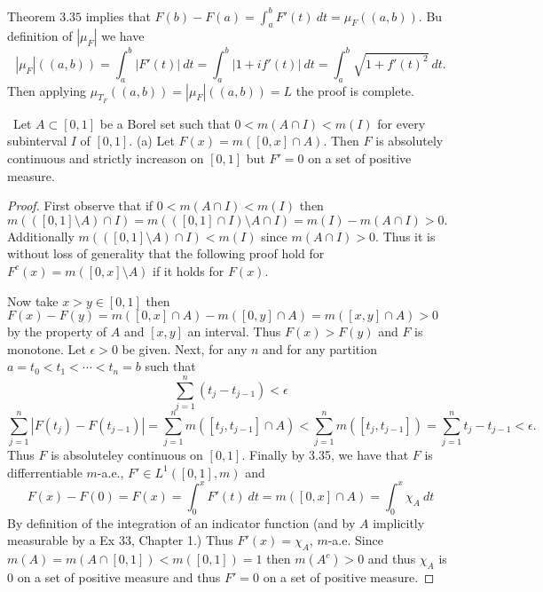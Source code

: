 \documentclass[11pt]{amsart}
\theoremstyle{definition}
\numberwithin{theorem}{section}
\numberwithin{definition}{section}
\numberwithin{equation}{section}
\begin{document}
	Theorem $3.35$ implies that $F(b) - F(a) = \int_a^b F'(t)\ dt = \mu_F((a,b)).$ Bu definition of $|\mu_F|$
	we have 
	\begin{equation*}
		|\mu_F|((a,b)) = \int_{a}^b|F'(t)|\ dt = \int_a^b |1 + i f'(t)|\ dt = \int_a^b \sqrt{1 + f'(t)^2}\ dt.
	\end{equation*}
	Then applying $\mu_{T_F}((a,b)) = |\mu_F|((a,b)) = L$ the proof is complete.

\medskip {}\ Let $A \subset [0,1]$ be a Borel set such that $0 < m(A\cap I) < m(I)$ for every subinterval $I$ of $[0,1]$.
(a) Let $F(x) = m([0,x] \cap A).$ Then $F$ is absolutely continuous and strictly increason on $[0,1]$ but $F' = 0$ on a set of positive measure.
\begin{proof}
	First observe that if $0 < m(A \cap I) < m(I)$ then $m(([0,1] \setminus A )\cap I) = m(([0,1] \cap I) \setminus A \cap I) = m(I) - m(A \cap I) > 0.$ Additionally $m(([0,1] \setminus A )\cap I) < m(I)$ since $m(A \cap I) > 0.$ Thus it is without loss of generality that the following proof hold for $F^c(x) = m([0,x] \setminus A)$ if it holds for $F(x).$

	Now take $x > y \in [0,1]$ then $F(x) - F(y) = m([0,x] \cap A) - m([0,y] \cap A) = m([x,y] \cap A) > 0$ by the property of $A$ and $[x,y]$ an interval. Thus $F(x) > F(y)$ and $F$ is monotone. Let $\epsilon > 0$ be given. Next, for any $n$ and for any partition $a = t_0 < t_1 <\cdots < t_n =b$ such that
	\begin{equation*}
		\sum_{j=1}^n (t_j - t_{j-1}) < \epsilon
	\end{equation*}
	\begin{equation*}
		\sum_{j=1}^n \left| F(t_j) - F(t_{j-1})\right| = \sum_{j=1}^n m([t_j, t_{j-1}] \cap A) < \sum_{j=1}^n m([t_j, t_{j-1}]) =\sum_{j=1}^n t_j - t_{j-1} < \epsilon.
	\end{equation*}
	Thus $F$ is absoluteley continuous on $[0,1]$. Finally by 3.35, we have that $F$ is differrentiable $m$-a.e., $F' \in L^1([0,1], m)$ and
	\begin{equation*}
		F(x) - F(0) = F(x) = \int_{0}^x F'(t)\ dt = m([0,x] \cap A) = \int_0^x \chi_A\ dt
	\end{equation*}
	By definition of the integration of an indicator function (and by $A$ implicitly measurable by a Ex 33, Chapter 1.) Thus $F'(x) = \chi_A$, $m$-a.e. Since $m(A) = m(A \cap [0,1]) < m([0,1]) = 1$ then $m(A^c) > 0$ and thus $\chi_A$ is $0$ on a set of positive measure and thus $F' = 0$ on a set of positive measure.
\end{proof}
\end{document}
